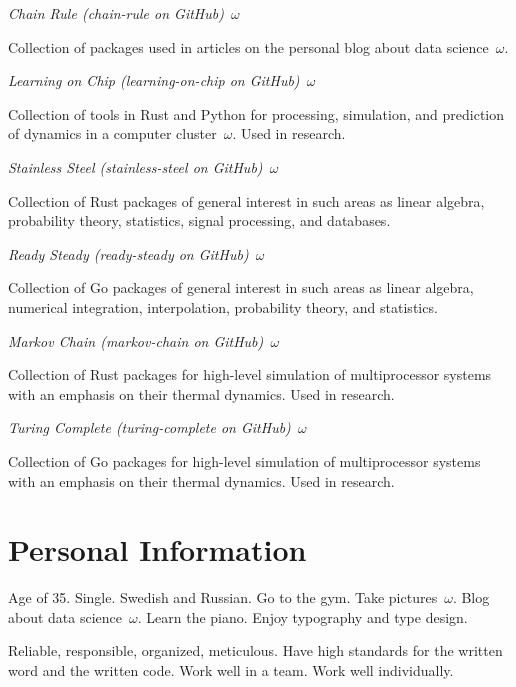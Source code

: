 \documentclass[journal]{IEEEtran}
\begin{document}
\emph{Chain Rule (chain-rule on GitHub)~$\omega$}

Collection of packages used in articles on the personal blog about data
science~$\omega$.

\emph{Learning on Chip (learning-on-chip on GitHub)~$\omega$}

Collection of tools in Rust and Python for processing, simulation, and
prediction of dynamics in a computer cluster~$\omega$. Used in research.

\emph{Stainless Steel (stainless-steel on GitHub)~$\omega$}

Collection of Rust packages of general interest in such areas as linear algebra,
probability theory, statistics, signal processing, and databases.

\emph{Ready Steady (ready-steady on GitHub)~$\omega$}

Collection of Go packages of general interest in such areas as linear algebra,
numerical integration, interpolation, probability theory, and statistics.

\emph{Markov Chain (markov-chain on GitHub)~$\omega$}

Collection of Rust packages for high-level simulation of multiprocessor systems
with an emphasis on their thermal dynamics. Used in research.

\emph{Turing Complete (turing-complete on GitHub)~$\omega$}

Collection of Go packages for high-level simulation of multiprocessor systems
with an emphasis on their thermal dynamics. Used in research.

\section{Personal Information}

Age of 35. Single. Swedish and Russian. Go to the gym. Take pictures~$\omega$.
Blog about data science~$\omega$. Learn the piano. Enjoy typography and type
design.

Reliable, responsible, organized, meticulous. Have high standards for the
written word and the written code. Work well in a team. Work well individually.
\end{document}
